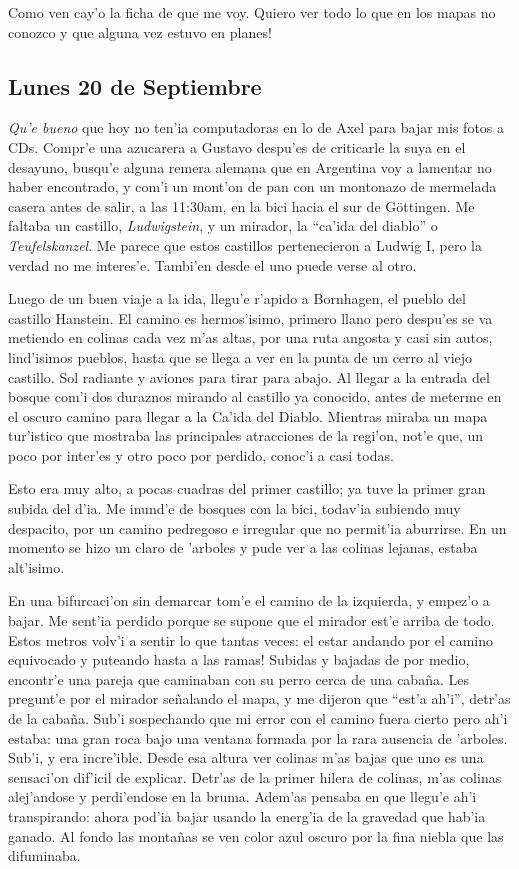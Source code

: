 Como ven cay'o la ficha de que me voy. \textexclamdown Quiero ver todo lo que
en los mapas no conozco y que alguna vez estuvo en planes!

\subsection*{Lunes 20 de Septiembre}

{\sl Qu'e bueno} que hoy no ten'ia computadoras en lo de Axel para bajar mis
fotos a {\small CD}s. Compr'e una azucarera a Gustavo despu'es de
criticarle la suya en el desayuno, busqu'e alguna remera alemana que en
Argentina voy a lamentar no haber encontrado, y com'i un mont'on de pan con un
montonazo de mermelada casera antes de salir, a las 11:30am, en la bici hacia el
sur de G\"ottingen. Me faltaba un castillo, {\sl Ludwigstein}, y un mirador, la
``ca'ida del diablo'' o {\sl Teufelskanzel}. Me parece que estos castillos
pertenecieron a Ludwig I, pero la verdad no me interes'e. Tambi'en desde el uno
puede verse al otro.

Luego de un buen viaje a la ida, llegu'e r'apido a Bornhagen, el pueblo del
castillo Hanstein. El camino es hermos'isimo, primero llano pero despu'es se va
metiendo en colinas cada vez m'as altas, por una ruta angosta y casi sin autos,
lind'isimos pueblos, hasta que se llega a ver en la punta de un cerro al viejo
castillo. Sol radiante y aviones para tirar para abajo. Al llegar a la entrada
del bosque com'i dos duraznos mirando al castillo ya conocido, antes de meterme
en el oscuro camino para llegar a la Ca'ida del Diablo. Mientras miraba un mapa
tur'istico que mostraba las principales atracciones de la regi'on, not'e que, un
poco por inter'es y otro poco por perdido, conoc'i a casi todas.

Esto era muy alto, a pocas cuadras del primer castillo; ya tuve la primer gran
subida del d'ia. Me inund'e de bosques con la bici, todav'ia subiendo muy
despacito, por un camino pedregoso e irregular que no permit'ia aburrirse. En un
momento se hizo un claro de 'arboles y pude ver a las colinas lejanas, estaba
alt'isimo.

En una bifurcaci'on sin demarcar tom'e el camino de la izquierda, y empez'o a
bajar. Me sent'ia perdido porque se supone que el mirador est'e arriba de todo.
Estos metros volv'i a sentir lo que tantas veces: \textexclamdown el estar
andando por el camino equivocado y puteando hasta a las ramas! Subidas y bajadas
de por medio, encontr'e una pareja que caminaban con su perro cerca de una
caba\~na. Les pregunt'e por el mirador se\~nalando el mapa, y me dijeron que
``est'a ah'i'', detr'as de la caba\~na. Sub'i sospechando que mi error con el
camino fuera cierto pero ah'i estaba: una gran roca bajo una ventana formada por
la rara ausencia de 'arboles. Sub'i, y era incre'ible. Desde
esa altura ver colinas m'as bajas que uno es una sensaci'on dif'icil de
explicar. Detr'as de la primer hilera de colinas, m'as colinas alej'andose y
perdi'endose en la bruma. Adem'as pensaba en que llegu'e ah'i transpirando:
ahora pod'ia bajar usando la energ'ia de la gravedad que hab'ia ganado. Al fondo
las monta\~nas se ven color azul oscuro por la fina niebla que las difuminaba.

